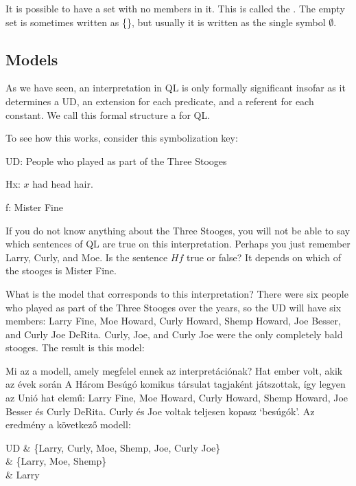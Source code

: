 It is possible to have a set with no members in it. This is called the . The empty set is sometimes written as \{\}, but usually it is written as the single symbol $\emptyset$.

\subsection{Models}
As we have seen, an interpretation in QL is only formally significant insofar as it determines a UD, an extension for each predicate, and a referent for each constant. We call this formal structure a  for QL.

To see how this works, consider this symbolization key:
\begin{ekey}
\item[UD:]People who played as part of the Three Stooges
\item[Hx:]$x$ had head hair.
\item[f:] Mister Fine
\end{ekey}
If you do not know anything about the Three Stooges, you will not be able to say which sentences of QL are true on this interpretation. Perhaps you just remember Larry, Curly, and Moe. Is the sentence $Hf$ true or false? It depends on which of the stooges is Mister Fine.



What is the model that corresponds to this interpretation? There were six people who played as part of the Three Stooges over the years, so the UD will have six members: Larry Fine, Moe Howard, Curly Howard, Shemp Howard, Joe Besser, and Curly Joe DeRita. Curly, Joe, and Curly Joe were the only completely bald stooges. The result is this model:

Mi az a modell, amely megfelel ennek az interpretációnak? Hat ember volt, akik az évek során A Három Besúgó komikus társulat tagjaként játszottak, így legyen az Unió hat elemű: Larry Fine, Moe Howard, Curly Howard, Shemp Howard, Joe Besser és Curly DeRita. Curly és Joe voltak teljesen kopasz `besúgók'. Az eredmény a következő modell:

\begin{partialmodel}
	UD & \{Larry, Curly, Moe, Shemp, Joe, Curly Joe\}\\
	 & \{Larry, Moe, Shemp\}\\
	 & Larry
\end{partialmodel}


